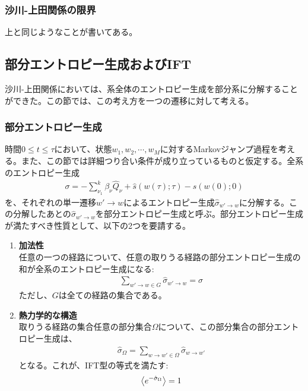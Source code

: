 \documentclass[a4paper,11pt]{jsarticle}
\numberwithin{equation}{section}
\begin{document}
\subsubsection{沙川-上田関係の限界}
上と同じようなことが書いてある。\\

\subsection{部分エントロピー生成およびIFT}
沙川-上田関係においては、系全体のエントロピー生成を部分系に分解することができた。この節では、この考え方を一つの遷移に対して考える。\\
\subsubsection{部分エントロピー生成}
時間$0 \leq t \leq \tau$において、状態$w_1, w_2, \cdots, w_M$に対するMarkovジャンプ過程を考える。また、この節では詳細つり合い条件が成り立っているものと仮定する。全系のエントロピー生成
\begin{align}
    \sigma = -\sum_{\nu_1}^{k} \beta_{\nu} \hat{Q}_{\nu} + \hat{s}(w(\tau); \tau) - \hat{s}(w(0); 0)
\end{align}
を、それぞれの単一遷移$w' \to w$によるエントロピー生成$\hat{\sigma}_{w' \to w}$に分解する。この分解したあとの$\hat{\sigma}_{w' \to w}$を部分エントロピー生成と呼ぶ。部分エントロピー生成が満たすべき性質として、以下の2つを要請する。
\begin{enumerate}
    \item \textbf{加法性}\\
    任意の一つの経路について、任意の取りうる経路の部分エントロピー生成の和が全系のエントロピー生成になる:
    \begin{align}
        \sum_{w'\to w\in G} \hat{\sigma}_{w' \to w} = \sigma
    \end{align}
    ただし、$G$は全ての経路の集合である。
    \item \textbf{熱力学的な構造}\\
    取りうる経路の集合任意の部分集合$\Omega$について、この部分集合の部分エントロピー生成は、
    \begin{align}
        \hat{\sigma}_{\Omega} = \sum_{w \to w' \in \Omega} \hat{\sigma}_{w \to w'}
    \end{align}
    となる。これが、IFT型の等式を満たす:
    \begin{align}
        \ev{e^{-\hat{\sigma}_{\Omega}}} = 1
    \end{align}
\end{enumerate}
\end{document}

